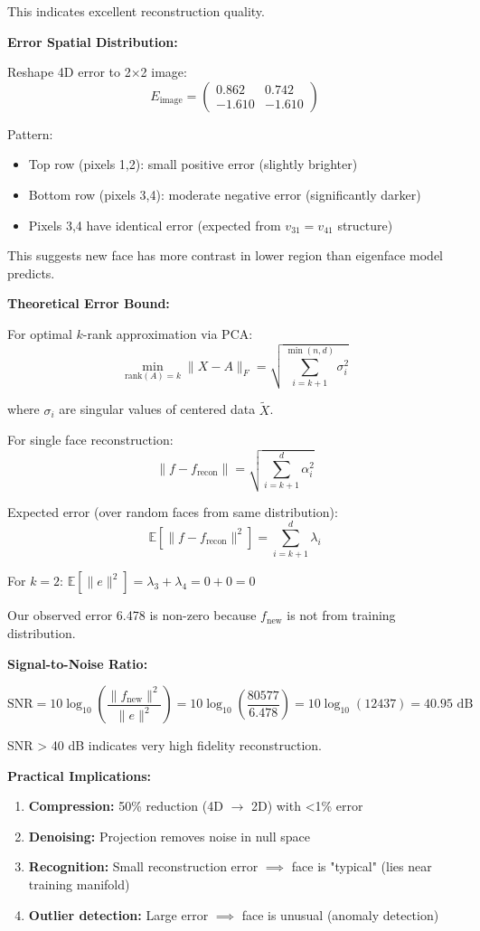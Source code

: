 \documentclass[12pt]{article}
\begin{document}
\begin{explanation}
This indicates excellent reconstruction quality.

\textbf{Error Spatial Distribution:}

Reshape 4D error to 2×2 image:
\[
E_{\text{image}} = \begin{pmatrix}
0.862 & 0.742 \\
-1.610 & -1.610
\end{pmatrix}
\]

Pattern:
\begin{itemize}
    \item Top row (pixels 1,2): small positive error (slightly brighter)
    \item Bottom row (pixels 3,4): moderate negative error (significantly darker)
    \item Pixels 3,4 have identical error (expected from $v_{31} = v_{41}$ structure)
\end{itemize}

This suggests new face has more contrast in lower region than eigenface model predicts.

\textbf{Theoretical Error Bound:}

For optimal $k$-rank approximation via PCA:
\[
\min_{\text{rank}(A)=k} \|X - A\|_F = \sqrt{\sum_{i=k+1}^{\min(n,d)} \sigma_i^2}
\]

where $\sigma_i$ are singular values of centered data $\tilde{X}$.

For single face reconstruction:
\[
\|f - f_{\text{recon}}\| = \sqrt{\sum_{i=k+1}^d \alpha_i^2}
\]

Expected error (over random faces from same distribution):
\[
\mathbb{E}[\|f - f_{\text{recon}}\|^2] = \sum_{i=k+1}^d \lambda_i
\]

For $k=2$: $\mathbb{E}[\|e\|^2] = \lambda_3 + \lambda_4 = 0 + 0 = 0$

Our observed error 6.478 is non-zero because $f_{\text{new}}$ is not from training distribution.

\textbf{Signal-to-Noise Ratio:}

\[
\text{SNR} = 10\log_{10}\left(\frac{\|f_{\text{new}}\|^2}{\|e\|^2}\right) = 10\log_{10}\left(\frac{80577}{6.478}\right) = 10\log_{10}(12437) = 40.95 \text{ dB}
\]

SNR > 40 dB indicates very high fidelity reconstruction.

\textbf{Practical Implications:}

\begin{enumerate}
    \item \textbf{Compression:} 50\% reduction (4D $\to$ 2D) with <1\% error
    \item \textbf{Denoising:} Projection removes noise in null space
    \item \textbf{Recognition:} Small reconstruction error $\implies$ face is "typical" (lies near training manifold)
    \item \textbf{Outlier detection:} Large error $\implies$ face is unusual (anomaly detection)
\end{enumerate}


\end{explanation}
\end{document}
